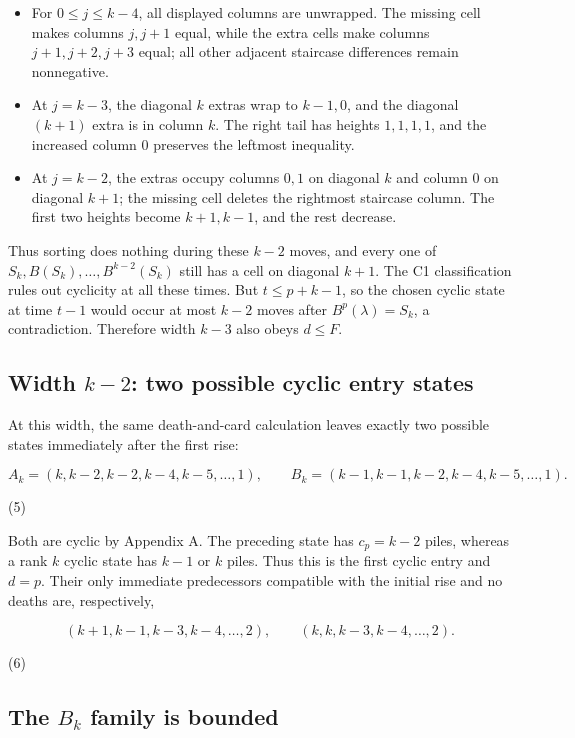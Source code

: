 \documentclass[11pt,a4paper]{article}
\begin{document}
\begin{itemize}
\item For $0\le j\le k-4$, all displayed columns are unwrapped. The missing cell makes columns $j,j+1$ equal, while the extra cells make columns $j+1,j+2,j+3$ equal; all other adjacent staircase differences remain nonnegative.
\item At $j=k-3$, the diagonal $k$ extras wrap to $k-1,0$, and the diagonal $(k+1)$ extra is in column $k$. The right tail has heights $1,1,1,1$, and the increased column $0$ preserves the leftmost inequality.
\item At $j=k-2$, the extras occupy columns $0,1$ on diagonal $k$ and column $0$ on diagonal $k+1$; the missing cell deletes the rightmost staircase column. The first two heights become $k+1,k-1$, and the rest decrease.
\end{itemize}

Thus sorting does nothing during these $k-2$ moves, and every one of $S_k,B(S_k),\ldots,B^{k-2}(S_k)$ still has a cell on diagonal $k+1$. The C1 classification rules out cyclicity at all these times. But $t\le p+k-1$, so the chosen cyclic state at time $t-1$ would occur at most $k-2$ moves after $B^p(\lambda)=S_k$, a contradiction. Therefore width $k-3$ also obeys $d\le F$.

\subsection{Width $k-2$: two possible cyclic entry states}

At this width, the same death-and-card calculation leaves exactly two possible states immediately after the first rise:

\[
A_k=(k,k-2,k-2,k-4,k-5,\ldots,1),\qquad
B_k=(k-1,k-1,k-2,k-4,k-5,\ldots,1).
\]

(5)

Both are cyclic by Appendix A. The preceding state has $c_p=k-2$ piles, whereas a rank $k$ cyclic state has $k-1$ or $k$ piles. Thus this is the first cyclic entry and $d=p$. Their only immediate predecessors compatible with the initial rise and no deaths are, respectively,

\[
(k+1,k-1,k-3,k-4,\ldots,2),\qquad
(k,k,k-3,k-4,\ldots,2).
\]

(6)

\subsection{The $B_k$ family is bounded}
\end{document}
